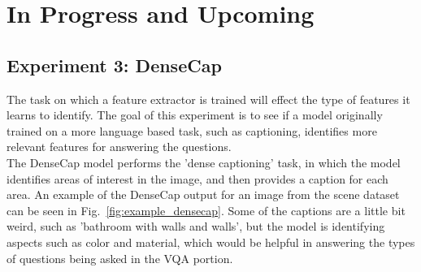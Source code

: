 \chapter{In Progress and Upcoming}
\section{Experiment 3: DenseCap}
The task on which a feature extractor is trained will effect the type of features it learns to identify. The goal of this experiment is to see if a model originally trained on a more language based task, such as captioning, identifies more relevant features for answering the questions. \\ %
The DenseCap model performs the 'dense captioning' task, in which the model identifies areas of interest in the image, and then provides a caption for each area\cite{densecap}. An example of the DenseCap output for an image from the scene dataset can be seen in Fig.~\ref{fig:example_densecap}. Some of the captions are a little bit weird, such as 'bathroom with walls and walls', but the model is identifying aspects such as color and material, which would be helpful in answering the types of questions being asked in the VQA portion. 


